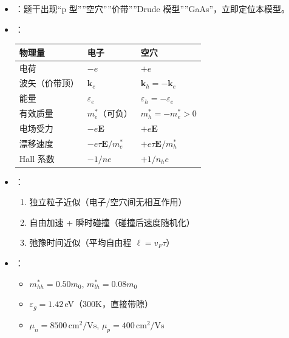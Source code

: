 \begin{tipbox}[快速识别与解题技巧]
\begin{itemize}
    \item {}：题干出现``p 型''''空穴''''价带''''Drude 模型''''GaAs''，立即定位本模型。
    \item {}：
    \begin{center}
    \begin{tabular}{lll}
    \toprule
    \textbf{物理量} & \textbf{电子} & \textbf{空穴} \\
    \midrule
    电荷 & $-e$ & $+e$ \\
    波矢（价带顶） & $\mathbf{k}_e$ & $\mathbf{k}_h=-\mathbf{k}_e$ \\
    能量 & $\varepsilon_e$ & $\varepsilon_h=-\varepsilon_e$ \\
    有效质量 & $m_e^*$（可负） & $m_h^*=-m_e^*>0$ \\
    电场受力 & $-e\mathbf{E}$ & $+e\mathbf{E}$ \\
    漂移速度 & $-e\tau\mathbf{E}/m_e^*$ & $+e\tau\mathbf{E}/m_h^*$ \\
    Hall 系数 & $-1/ne$ & $+1/n_h e$ \\
    \bottomrule
    \end{tabular}
    \end{center}
    \item {}：
    \begin{enumerate}[nosep]
        \item 独立粒子近似（电子/空穴间无相互作用）
        \item 自由加速 + 瞬时碰撞（碰撞后速度随机化）
        \item 弛豫时间近似（平均自由程 $\ell=v_F\tau$）
    \end{enumerate}
    \item {}：
    \begin{itemize}[nosep]
        \item $m_{hh}^*=0.50m_0$, $m_{lh}^*=0.08m_0$
        \item $\varepsilon_g=1.42\,$eV（300K，直接带隙）
        \item $\mu_n=8500\,\text{cm}^2/\text{Vs}$, $\mu_p=400\,\text{cm}^2/\text{Vs}$
    \end{itemize}
\end{itemize}
\end{tipbox}

